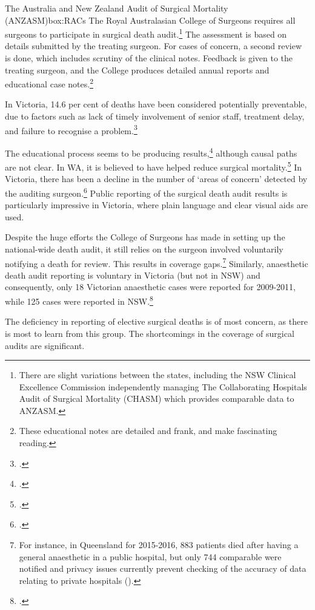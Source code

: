 \documentclass[FrontPage]{grattan}
\begin{document}
\begin{smallbox}{The Australia and New Zealand Audit of Surgical Mortality (ANZASM)}{box:RACs}
The Royal Australasian College of Surgeons requires all surgeons to participate in surgical death audit.\footnote{There are slight variations between the states, including the NSW Clinical Excellence Commission independently managing The Collaborating Hospitals Audit of Surgical Mortality (CHASM) which provides comparable data to ANZASM.}
The assessment is based on details submitted by the treating surgeon. For cases of concern, a second review is done, which includes scrutiny of the clinical notes. Feedback is given to the treating surgeon, and the College produces detailed annual reports and educational case notes.\footnote{These educational notes are detailed and frank, and make fascinating reading.}

In Victoria, 14.6 per cent of deaths have been considered potentially preventable, due to factors such as lack of timely involvement of senior staff, treatment delay, and failure to recognise a problem.\footcite{ANS:ANS13804}

The educational process seems to be producing results,\footcite{RN44} although causal paths are not clear.
In WA, it is believed to have helped reduce surgical mortality.\footcites{RN45}{semmens2005western}
In Victoria, there has been a decline in the number of ‘areas of concern’ detected by the auditing surgeon.\footcite{RN46}
Public reporting of the surgical death audit results is particularly impressive in Victoria, where plain language and clear visual aids are used. 
\end{smallbox}

Despite the huge efforts the College of Surgeons has made in setting up the national-wide death audit, it still relies on the surgeon involved voluntarily notifying a death for review. This results in coverage gaps.\footnote{For instance, in Queensland for 2015-2016, 883 patients died after having a general anaesthetic in a public hospital, but only 744 comparable were notified and privacy issues currently prevent checking of the accuracy of data relating to private hospitals (\textcite{QASM2017}).}
Similarly, anaesthetic death audit reporting is voluntary in Victoria (but not in NSW) and consequently, only 18 Victorian anaesthetic cases were reported for 2009-2011, while 125 cases were reported in NSW.\footcite{mcnicol2014safety}

The deficiency in reporting of elective surgical deaths is of most concern, as there is most to learn from this group. The shortcomings in the coverage of surgical audits are significant.
\end{document}
